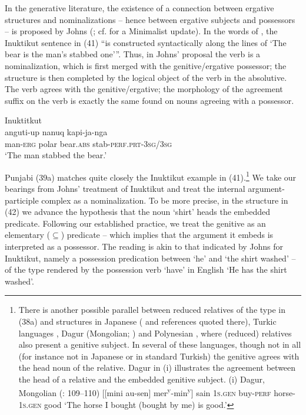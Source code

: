\documentclass[output=paper]{langsci/langscibook}
\begin{document}
In the generative literature, the existence of a connection between ergative structures and nominalizations – hence between ergative subjects and possessors – is proposed by Johns (\citeyear{Johns1992}; cf. \citealt{Yuan2013} for a Minimalist update). In the words of \citet[61]{Johns1992}, the Inuktikut sentence in (41) “is constructed syntactically along the lines of ‘The bear is the man’s stabbed one’”. Thus, in Johns’ proposal the verb is a nominalization, which is first merged with the genitive/ergative possessor; the structure is then completed by the logical object of the verb in the absolutive. The verb agrees with the genitive/ergative; the morphology of the agreement suffix on the verb is exactly the same found on nouns agreeing with a possessor.

\ea%
         Inuktitkut \citep[61]{Johns1992}\label{ex:manzini:41}\\
    \gll anguti-up   nanuq     kapi-ja-nga\\
         man-\textsc{erg}   polar bear.\textsc{abs}  stab-\textsc{perf.prt-3sg/3sg}\\
    \glt ‘The man stabbed the bear.’
\z

Punjabi (39a) matches quite closely the Inuktikut example in (41).\footnote{There is another possible parallel between reduced relatives of the type in (38a) and structures in Japanese (\citealt{Miyagawa2011} and references quoted there), Turkic languages \citep{Kornfilt2008}, Dagur (Mongolian; \citealt{Hale2002}) and Polynesian \citep{HerdEtAl2011}, where (reduced) relatives also present a genitive subject. In several of these languages, though not in all (for instance not in Japanese or in standard Turkish) the genitive agrees with the head noun of the relative. Dagur in (i) illustrates the agreement between the head of a relative and the embedded genitive subject. (i)  Dagur, Mongolian (\citealt{Hale2002}: 109–110)   [[mini   au-sen]    mer\textsuperscript{y}{}-min\textsuperscript{y}]   sain  \textsc{1s.gen}  buy-\textsc{perf}  horse-\textsc{1s.gen}  good  ‘The horse I bought (bought by me) is good.’ }  We take our bearings from Johns’ treatment of Inuktikut and treat the internal argument-participle complex as a nominalization. To be more precise, in the structure in (42) we advance the hypothesis that the noun ‘shirt’ heads the embedded predicate. Following our established practice, we treat the genitive as an elementary ($\subseteq$) predicate – which implies that the argument it embeds is interpreted as a possessor. The reading is akin to that indicated by Johns for Inuktikut, namely a possession predication between ‘he’ and ‘the shirt washed’ – of the type rendered by the possession verb ‘have’ in English ‘He has the shirt washed’.  
\end{document}
